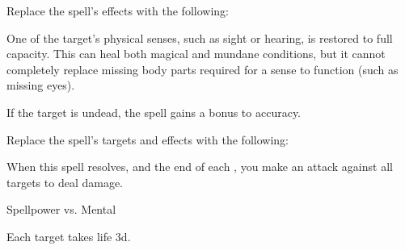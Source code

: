 


Replace the spell's effects with the following:
\begin{spellcontent}

\begin{augmenteffects}



\spelleffect
One of the target's physical senses, such as sight or hearing, is restored to full capacity.
This can heal both magical and mundane conditions, but it cannot completely replace missing body parts required for a sense to function (such as missing eyes).








\end{augmenteffects}

\end{spellcontent}






If the target is undead, the spell gains a  bonus to accuracy.









Replace the spell's targets and effects with the following:
\begin{spellcontent}

\begin{augmenttargetinginfo}




\end{augmenttargetinginfo}


\begin{augmenteffects}



\spelleffect
When this spell resolves, and the end of each , you make an attack against all targets to deal damage.




\begin{spellattack}{Spellpower vs. Mental}


\hit
Each target takes life  \minus3d.



\end{spellattack}





\end{augmenteffects}

\end{spellcontent}





